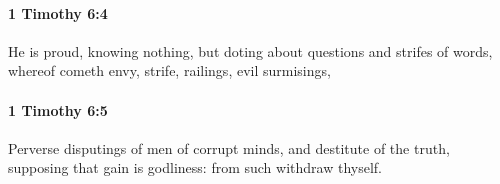 		\paragraph{1 Timothy 6:4} %
			\label{1TIMOTHY-6-4}

			He is proud, knowing nothing, but doting about questions and strifes of words, whereof cometh envy, strife, railings, evil surmisings,

			\begin{framed}
			\scriptsize
				\begin{compactdesc}
					\item[SBLG] 
				\end{compactdesc}
			\end{framed}

		\paragraph{1 Timothy 6:5} %
			\label{1TIMOTHY-6-5}

			Perverse disputings of men of corrupt minds, and destitute of the truth, supposing that gain is godliness: from such withdraw thyself.


